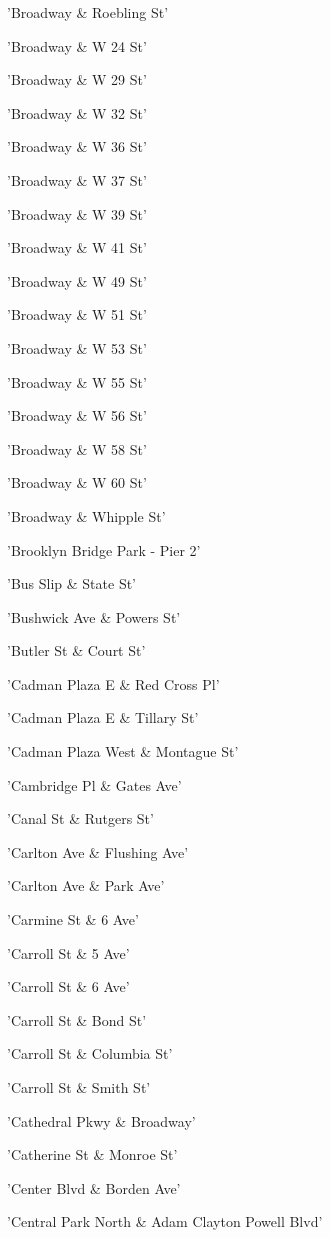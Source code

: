 \documentclass[11pt]{article}
\begin{document}
\begin{enumerate*}
\item 'Broadway \& Roebling St'
\item 'Broadway \& W 24 St'
\item 'Broadway \& W 29 St'
\item 'Broadway \& W 32 St'
\item 'Broadway \& W 36 St'
\item 'Broadway \& W 37 St'
\item 'Broadway \& W 39 St'
\item 'Broadway \& W 41 St'
\item 'Broadway \& W 49 St'
\item 'Broadway \& W 51 St'
\item 'Broadway \& W 53 St'
\item 'Broadway \& W 55 St'
\item 'Broadway \& W 56 St'
\item 'Broadway \& W 58 St'
\item 'Broadway \& W 60 St'
\item 'Broadway \& Whipple St'
\item 'Brooklyn Bridge Park - Pier 2'
\item 'Bus Slip \& State St'
\item 'Bushwick Ave \& Powers St'
\item 'Butler St \& Court St'
\item 'Cadman Plaza E \& Red Cross Pl'
\item 'Cadman Plaza E \& Tillary St'
\item 'Cadman Plaza West \& Montague St'
\item 'Cambridge Pl \& Gates Ave'
\item 'Canal St \& Rutgers St'
\item 'Carlton Ave \& Flushing Ave'
\item 'Carlton Ave \& Park Ave'
\item 'Carmine St \& 6 Ave'
\item 'Carroll St \& 5 Ave'
\item 'Carroll St \& 6 Ave'
\item 'Carroll St \& Bond St'
\item 'Carroll St \& Columbia St'
\item 'Carroll St \& Smith St'
\item 'Cathedral Pkwy \& Broadway'
\item 'Catherine St \& Monroe St'
\item 'Center Blvd \& Borden Ave'
\item 'Central Park North \& Adam Clayton Powell Blvd'

\end{enumerate*}
\end{document}
